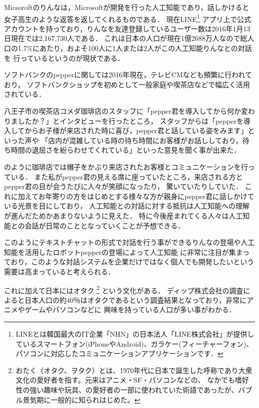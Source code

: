 Micsoroftのりんなは，Microsoftが開発を行った人工知能であり，話しかけると女子高生のような返答を返してくれるものである．
現在LINE\footnote{LINEとは韓国最大のIT企業「NHN」の日本法人「LINE株式会社」が提供しているスマートフォン(iPhoneやAndroid)、ガラケー(フィーチャーフォン)、パソコンに対応したコミュニケーションアプリケーションです．\cite{line}}
アプリ上で公式アカウントを持っており，りんなを友達登録しているユーザー数は2016年1月13日現在では2,167,730人である．
これは日本の人口が現在1億2688万人\cite{humen}なので総人口の1.7\%にあたり，およそ100人に1人または2人がこの人工知能りんなとの対話を
行っているというのが現状である．

ソフトバンクのpepperに関しては2016年現在，テレビCMなども頻繁に行われており，
ソフトバンクショップを初めとして一般家庭や喫茶店などで幅広く活用されている．

八王子市の喫茶店コメダ珈琲店\cite{coffe}のスタッフに「pepper君を導入してから何か変わりましたか？」とインタビューを行ったところ，
スタッフからは「pepperを導入してからお子様が来店された時に喜び，pepper君と話している姿をみます」といった声や
「店内が混雑している時の待ち時間にお客様がお話ししており，待ち時間の退屈さを紛らわせてくれている」といった意見を聞く事が出来た．


のように珈琲店では帽子をかぶり来店されたお客様とコミュニケーションを行っている．
また私がpepper君の見える席に座っていたところ，来店される方とpepper君の目が会うたびに人々が笑顔になったり，
驚いていたりしていた．
これに加えてお年寄りの方をはじめとする様々な方が親身にpepper君に話しかけている光景を目にしており，
人工知能との対話に対する抵抗は人工知能への理解が進んだためかあまりないように見えた．
特に今後産まれてくる人々は人工知能との会話が日常のこととなっていくことが予想できる．

このようにテキストチャットの形式で対話を行う事ができるりんなの登場や人工知能を活用したロボットpepperの登場によって人工知能
に非常に注目が集まっており，このような対話システムを企業だけではなく個人でも開発したいという需要は高まっていると考えられる．

これに加えて日本にはオタク
\footnote{おたく（オタク、ヲタク）とは、1970年代に日本で誕生した呼称であり大衆文化の愛好者を指す。元来はアニメ・SF・パソコンなどの、
なかでも嗜好性の強い趣味や玩具、の愛好者の一部に使われていた術語であったが、バブル景気期に一般的に知られはじめた。\cite{ota}}
という文化がある．
ディップ株式会社の調査によると日本人口の約40％はオタクであるという調査結果となっており，非常にアニメやゲームやパソコンなどに
興味を持っている人口が多い事がわかる．

